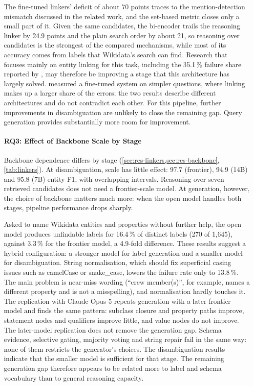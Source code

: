 The fine-tuned linkers' deficit of about 70 points traces to the mention-detection mismatch discussed in the related work, and the set-based metric closes only a small part of it.
Given the same candidates, the bi-encoder trails the reasoning linker by 24.9 points and the plain search order by about 21, so reasoning over candidates is the strongest of the compared mechanisms, while most of its accuracy comes from labels that Wikidata's search can find.
Research that focuses mainly on entity linking for this task, including the 35.1\,\% failure share reported by \citet{xu2023wikisp}, may therefore be improving a stage that this architecture has largely solved.
\citet{xu2023wikisp} measured a fine-tuned system on simpler questions, where linking makes up a larger share of the errors; the two results describe different architectures and do not contradict each other.
For this pipeline, further improvements in disambiguation are unlikely to close the remaining gap. Query generation provides substantially more room for improvement.

\paragraph{RQ3: Effect of Backbone Scale by Stage}

\label{sec:disc-rq3}

Backbone dependence differs by stage (\cref{sec:res-linkers,sec:res-backbone}, \cref{tab:linkers}).
At disambiguation, scale has little effect: 97.7 (frontier), 94.9 (14B) and 95.8 (7B) entity F1, with overlapping intervals.
Reasoning over seven retrieved candidates does not need a frontier-scale model.
At generation, however, the choice of backbone matters much more: when the open model handles both stages, pipeline performance drops sharply.

Asked to name Wikidata entities and properties without further help, the open model produces unfindable labels for 16.4\,\% of distinct labels (270 of 1,645), against 3.3\,\% for the frontier model, a 4.9-fold difference.
These results suggest a hybrid configuration: a stronger model for label generation and a smaller model for disambiguation.
String normalisation, which should fix superficial casing issues such as camelCase or snake\_case, lowers the failure rate only to 13.8\,\%.
The main problem is near-miss wording (``crew member(s)'', for example, names a different property and is not a misspelling), and normalisation hardly touches it.
The replication with Claude Opus 5 repeats generation with a later frontier model and finds the same pattern: subclass closure and property paths improve, statement nodes and qualifiers improve little, and value nodes do not improve.
The later-model replication does not remove the generation gap.
Schema evidence, selective gating, majority voting and string repair fail in the same way: none of them restricts the generator's choices.
The disambiguation results indicate that the smaller model is sufficient for that stage. The remaining generation gap therefore appears to be related more to label and schema vocabulary than to general reasoning capacity.

